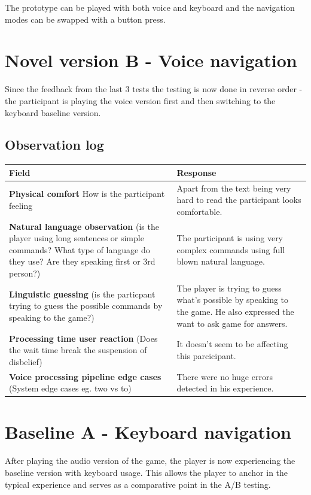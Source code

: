 The prototype can be played with both voice and keyboard and the navigation modes can be swapped with a button press. 


\section{Novel version B - Voice navigation}

Since the feedback from the last 3 tests the testing is now done in reverse order - the participant is playing the voice version first and then switching to the keyboard baseline version.


\subsection{Observation log}
\begin{table}[H]
\centering
\begin{tabular}{|p{5cm}|p{10cm}|}
\hline
\textbf{Field} & \textbf{Response} \\ \hline
\textbf{Physical comfort} How is the participant feeling & Apart from the text being very hard to read the participant looks comfortable.\\[1.5cm] \hline
\textbf{Natural language observation} (is the player using long sentences or simple commands? What type of language do they use? Are they speaking first or 3rd person?) & The participant is using very complex commands using full blown natural language. \\[1.5cm] \hline
\textbf{Linguistic guessing} (is the particpant trying to guess the possible commands by speaking to the game?) & The player is trying to guess what's possible by speaking to the game. He also expressed the want to ask game for answers. \\[1.5cm] \hline
\textbf{Processing time user reaction} (Does the wait time break the suspension of disbelief) & It doesn't seem to be affecting this parcicipant. \\[1.5cm] \hline
\textbf{Voice processing pipeline edge cases} (System edge cases eg. two vs to)& There were no huge errors detected in his experience. \\[1.5cm] \hline
\end{tabular}
\end{table}


\section{Baseline A - Keyboard navigation}
After playing the audio version of the game, the player is now experiencing the baseline version with keyboard usage.
This allows the player to anchor in the typical experience and serves as a comparative point in the A/B testing.

